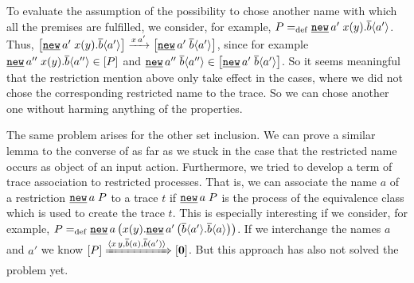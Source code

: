 To evaluate the assumption of the possibility to chose another name with which all the premises are fulfilled, we consider, for example, $P\define\procres{a'}{\inp{x}{y}.\out{b}{a'}}$. Thus, $\ec{\procres{a'}{\inp{x}{y}.\out{b}{a'}}}\intrans{x}{a'}\ec{\procres{a'}{\out{b}{a'}}}$, since for example $\procres{a''}{\inp{x}{y}.\out{b}{a''}}\in\ec{P}$ and $\procres{a''}{\out{b}{a''}}\in\ec{\procres{a'}{\out{b}{a'}}}$. So it seems meaningful that the restriction mention above only take effect in the cases, where we did not chose the corresponding restricted name to the trace. So we can chose another one without harming anything of the properties.

The same problem arises for the other set inclusion. We can prove a similar lemma to the converse of  as far as we stuck in the case that the restricted name occurs as object of an input action. Furthermore, we tried to develop a term of trace association to restricted processes. That is, we can associate the name $a$ of a restriction $\procres{a}{P}$ to a trace $t$ if $\procres{a}{P}$ is the process of the equivalence class which is used to create the trace $t$. This is especially interesting if we consider, for example, $P\define\procres[()]{a}{\inp{x}{y}.\procres[()]{a'}{\out{b}{a'}.\out{b}{a}}}$. If we interchange the names $a$ and $a'$ we know $\left[P\right]\xRightarrow{\langle x\,y,\overline{b}(a),\overline{b}(a')\rangle}\left[\mathbf{0}\right]$. But this approach has also not solved the problem yet.

